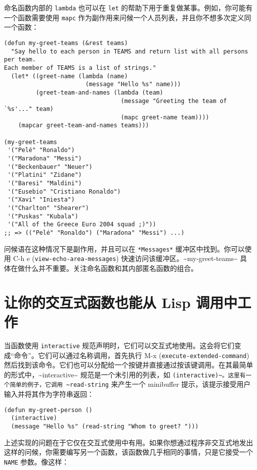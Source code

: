 \documentclass[11pt]{ctexart}
\begin{document}
命名函数内部的 \texttt{lambda} 也可以在 \texttt{let} 的帮助下用于重复做某事。例如，你可能有一个函数需要使用 \texttt{mapc} 作为副作用来问候一个人员列表，并且你不想多次定义同一个函数：

\begin{verbatim}
(defun my-greet-teams (&rest teams)
  "Say hello to each person in TEAMS and return list with all persons per team.
Each member of TEAMS is a list of strings."
  (let* ((greet-name (lambda (name)
                       (message "Hello %s" name)))
         (greet-team-and-names (lambda (team)
                                 (message "Greeting the team of `%s'..." team)
                                 (mapc greet-name team))))
    (mapcar greet-team-and-names teams)))

(my-greet-teams
 '("Pelé" "Ronaldo")
 '("Maradona" "Messi")
 '("Beckenbauer" "Neuer")
 '("Platini" "Zidane")
 '("Baresi" "Maldini")
 '("Eusebio" "Cristiano Ronaldo")
 '("Xavi" "Iniesta")
 '("Charlton" "Shearer")
 '("Puskas" "Kubala")
 '("All of the Greece Euro 2004 squad ;)"))
;; => (("Pelé" "Ronaldo") ("Maradona" "Messi") ...)
\end{verbatim}

问候语在这种情况下是副作用，并且可以在 \texttt{*Messages*} 缓冲区中找到。你可以使用 C-h e (\texttt{view-echo-area-messages}) 快速访问该缓冲区。\textasciitilde{}my-greet-teams\textasciitilde{} 具体在做什么并不重要。关注命名函数和其内部匿名函数的组合。
\section{让你的交互式函数也能从 Lisp 调用中工作}
\label{sec:orgf9b460c}
当函数使用 \texttt{interactive} 规范声明时，它们可以交互式地使用。这会将它们变成“命令”。它们可以通过名称调用，首先执行 M-x (\texttt{execute-extended-command}) 然后找到该命令。它们也可以分配给一个按键并直接通过按该键调用。在其最简单的形式中，\textasciitilde{}interactive\textasciitilde{} 规范是一个未引用的列表，如 \texttt{(interactive)\textasciitilde{}。这里有一个简单的例子，它调用 \textasciitilde{}read-string} 来产生一个 minibuffer 提示，该提示接受用户输入并将其作为字符串返回：

\begin{verbatim}
(defun my-greet-person ()
  (interactive)
  (message "Hello %s" (read-string "Whom to greet? ")))
\end{verbatim}

上述实现的问题在于它仅在交互式使用中有用。如果你想通过程序非交互式地发出这样的问候，你需要编写另一个函数，该函数做几乎相同的事情，只是它接受一个 \texttt{NAME} 参数。像这样：
\end{document}
